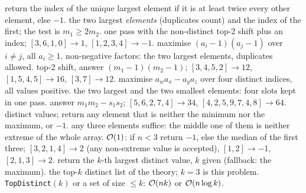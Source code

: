 \begin{variantsbox}
  {return the index of the unique largest element if it is at least twice every other element, else $-1$.}
  {the two largest \emph{elements} (duplicates count) and the index of the first; the test is $m_1 \ge 2 m_2$.}
  {one pass with the non-distinct top-2 shift plus an index; $[3,6,1,0] \to 1$, $[1,2,3,4] \to -1$.}
  {maximise $(a_i - 1)(a_j - 1)$ over $i \ne j$, all $a_i \ge 1$.}
  {non-negative factors: the two largest elements, duplicates allowed.}
  {top-2 shift, answer $(m_1-1)(m_2-1)$; $[3,4,5,2] \to 12$, $[1,5,4,5] \to 16$, $[3,7] \to 12$.}
  {maximise $a_w a_x - a_y a_z$ over four distinct indices, all values positive.}
  {the two largest and the two smallest elements: four slots kept in one pass.}
  {answer $m_1 m_2 - s_1 s_2$; $[5,6,2,7,4] \to 34$, $[4,2,5,9,7,4,8] \to 64$.}
  {distinct values; return any element that is neither the minimum nor the maximum, or $-1$.}
  {any three elements suffice: the middle one of them is neither extreme of the whole array.}
  {$\mathcal{O}(1)$: if $n < 3$ return $-1$, else the median of the first three; $[3,2,1,4] \to 2$ (any non-extreme value is accepted), $[1,2] \to -1$, $[2,1,3] \to 2$.}
  {return the $k$-th largest distinct value, $k$ given (fallback: the maximum).}
  {the top-$k$ distinct list of the theory; $k = 3$ is this problem.}
  {\texttt{TopDistinct}$(k)$ or a set of size $\le k$: $\mathcal{O}(nk)$ or $\mathcal{O}(n \log k)$.}
\end{variantsbox}
